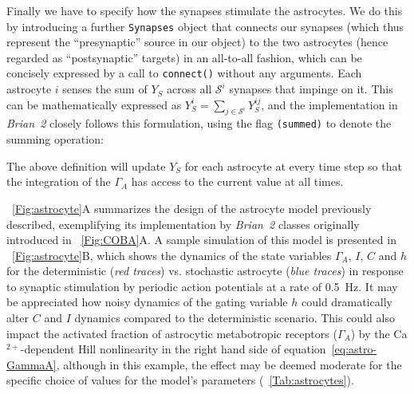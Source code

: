\documentclass[a4paper, 11pt]{article}
\newcommand{\brian}{\emph{Brian~2}\xspace}
\newcommand*{\tabref}[1]{\tablename~\ref{#1}}
\newcommand*{\figref}[1]{\figurename~\ref{#1}}
\renewcommand*{\eqref}[1]{equation~\ref{#1}}
\begin{document}
Finally we have to specify how the synapses stimulate the astrocytes.
We do this by introducing a further \lstinline|Synapses| object that connects our synapses (which thus represent the ``presynaptic'' source in our object) to the two astrocytes (hence regarded as ``postsynaptic'' targets) in an all-to-all fashion, which can be concisely expressed by a call to \lstinline|connect()| without any arguments.
Each astrocyte $i$ senses the sum of $Y_S$ across all $\mathcal{S}^i$ synapses that impinge on it. This can be mathematically expressed as $Y_S^{i} = \sum_{j \in \mathcal{S}^i} Y_S^{ij}$, and the implementation in \brian closely follows this formulation, using the flag \lstinline|(summed)| to denote the summing operation:

The above definition will update $Y_S$ for each astrocyte at every time step so that the integration of the $\Gamma_A$ has access to the current value at all times.

\figref{Fig:astrocyte}A summarizes the design of the astrocyte model previously described, exemplifying its implementation by \brian classes originally introduced in \figref{Fig:COBA}A.
A sample simulation of this model is presented in \figref{Fig:astrocyte}B, which shows the  dynamics of the state variables $\Gamma_A,\,I,\,C$ and $h$ for the deterministic (\textit{red traces}) vs. stochastic astrocyte (\textit{blue traces}) in response to synaptic stimulation by periodic action potentials at a rate of \SI{0.5}{\hertz}.
It may be appreciated how noisy dynamics of the gating variable $h$ could dramatically alter $C$ and $I$ dynamics compared to the deterministic scenario.
This could also impact the activated fraction of astrocytic metabotropic receptors ($\Gamma_A$) by the Ca$^{2+}$-dependent Hill nonlinearity in the right hand side of \eqref{eq:astro-GammaA}, although in this example, the effect may be deemed moderate for the specific choice of values for the model's parameters (\tabref{Tab:astrocytes}).
\end{document}
